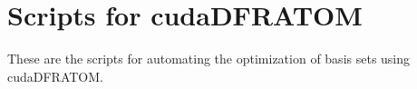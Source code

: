 \chapter{Scripts for cudaDFRATOM}
These are the scripts for automating the optimization of basis sets using cudaDFRATOM.


